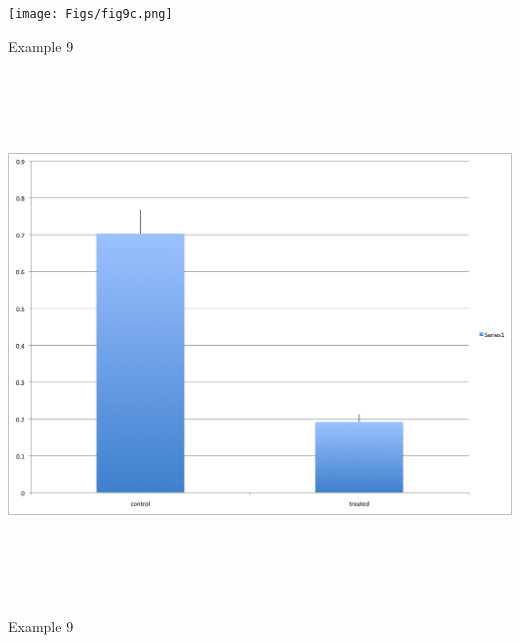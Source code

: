 \documentclass[12pt]{article}
\newcommand{\headsize}{\fontsize{35}{35} \selectfont}
\begin{document}
\centerline{\texttt{[image: Figs/fig9c.png]}}


\newpage


\headsize \color{myyellow}
\hfill \begin{minipage}{5.75in}
\centering
Example 9
\end{minipage}

\vspace{30mm}

\centerline{\includegraphics[height=5.5in]{Figs/fig9d.png}}


\newpage


\headsize \color{myyellow}
\hfill \begin{minipage}{5.75in}
\centering
Example 9
\end{minipage}

\vspace{30mm}
\end{document}
